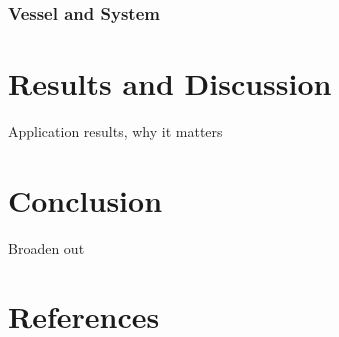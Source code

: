 \documentclass[preprint,12pt]{elsarticle}
\begin{document}
\subsubsection{Vessel and System}


\section{Results and Discussion}
Application results, why it matters

\section{Conclusion}
Broaden out


\section*{References}
 





%
%
%
\end{document}

